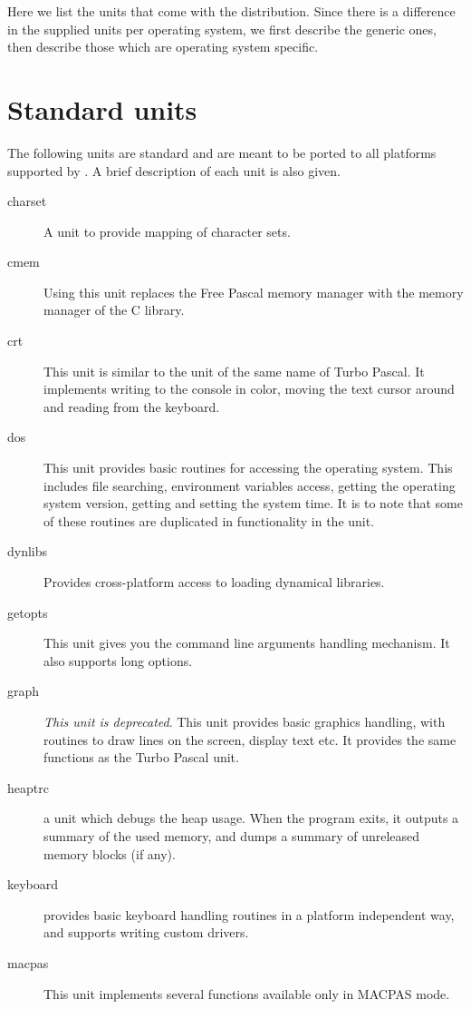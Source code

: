 Here we list the units that come with the \fpc distribution. Since there is
a difference in the supplied units per operating system, we first describe
the generic ones, then describe those which are operating system specific. 

%
%
\section{Standard units}

The following units are standard and are meant to be ported to
all platforms supported by \fpc. A brief description of each unit
is also given.

\begin{description}
\item[charset] A unit to provide mapping of character sets.
\item[cmem] Using this unit replaces the Free Pascal memory manager with the 
memory manager of the C library.
\item[crt] This unit is similar to the unit of the same name of
Turbo Pascal. It implements writing to the console in color, moving the 
text cursor around and reading from the keyboard.
\item[dos] This unit provides basic routines for accessing the operating
system. This includes file searching, environment variables access,
getting the operating system version, getting and setting the
system time. It is to note that some of these routines are duplicated
in functionality in the  unit.
\item[dynlibs] Provides cross-platform access to loading dynamical libraries.
\item[getopts] This unit gives you the \gnu {} command line
arguments handling mechanism. It also supports long options.
\item[graph] \emph{This unit is deprecated}. This unit provides basic graphics handling, with routines to
draw lines on the screen, display text etc. It provides the same functions
as the Turbo Pascal unit. 
\item[heaptrc] a unit which debugs the heap usage. When the program exits, it outputs a summary of the used memory, and dumps a summary of unreleased memory blocks (if any).
\item[keyboard] provides basic keyboard handling routines in a platform independent way,
and supports writing custom drivers.
\item[macpas] This unit implements several functions available only in MACPAS mode. 

\end{description}
